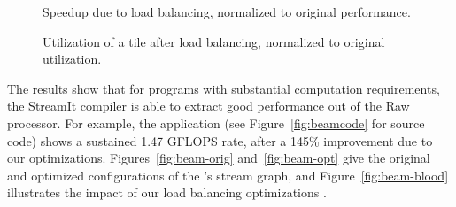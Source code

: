 \begin{figure}
\begin{minipage}{3.2in}
\centering
{}
\caption{Speedup due to load balancing, normalized to original performance.
\protect\label{fig:opt-diagram}}
\end{minipage}
\hspace{0.1in}
\begin{minipage}{3.2in}
\centering
{}
\caption{Utilization of a tile after load balancing, normalized to original utilization.\protect\label{fig:utilization-diagram}}
\end{minipage}
\end{figure}

The results show that for programs with substantial computation
requirements, the StreamIt compiler is able to extract good
performance out of the Raw processor.  For example, the \BeamFormer
application (see Figure~\ref{fig:beamcode} for source code) shows a
sustained 1.47 GFLOPS rate, after a 145\% improvement due to our
optimizations.  Figures~\ref{fig:beam-orig} and~\ref{fig:beam-opt}
give the original and optimized configurations of the \BeamFormer's
stream graph, and Figure~\ref{fig:beam-blood} illustrates the impact
of our load balancing optimizations .
%
